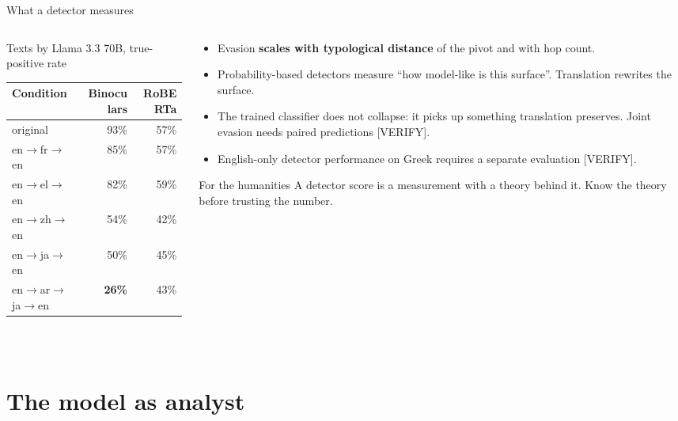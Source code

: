 \documentclass[aspectratio=169, 10pt]{beamer}
\newcommand{\hl}[1]{\textcolor{terracotta}{\textbf{#1}}}
\begin{document}
\begin{frame}{What a detector measures}
  \footnotesize
  \setlength{\parskip}{0pt}
  \begin{columns}[T]
    \begin{column}{0.5\textwidth}
      \centering
      \scriptsize
      Texts by Llama 3.3 70B, true-positive rate\\[3pt]
      \begin{tabular}{lrr}
        \toprule
        \textbf{Condition} & \textbf{Binoculars} & \textbf{RoBERTa} \\
        \midrule
        original & 93\% & 57\% \\
        en$\to$fr$\to$en & 85\% & 57\% \\
        en$\to$el$\to$en & 82\% & 59\% \\
        en$\to$zh$\to$en & 54\% & 42\% \\
        en$\to$ja$\to$en & 50\% & 45\% \\
        en$\to$ar$\to$ja$\to$en & \hl{26\%} & 43\% \\
        \bottomrule
      \end{tabular}\\[3pt]
    \end{column}
    \begin{column}{0.48\textwidth}
      \footnotesize
      \begin{itemize}
        \item Evasion \textbf{scales with typological distance} of the pivot and with hop count.
        \item Probability-based detectors measure ``how model-like is this surface''. Translation rewrites the surface.
        \item The trained classifier does not collapse: it picks up something translation preserves. Joint evasion needs paired predictions [VERIFY].
        \item English-only detector performance on Greek requires a separate evaluation [VERIFY].
      \end{itemize}
      \begin{block}{For the humanities}
        A detector score is a measurement with a theory behind it. Know the theory before trusting the number.
      \end{block}
    \end{column}
  \end{columns}
\end{frame}

\section{The model as analyst}
\end{document}
